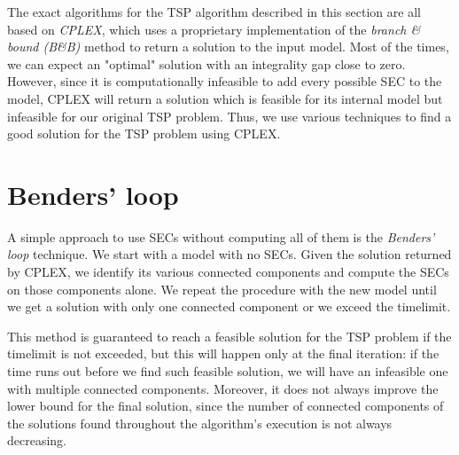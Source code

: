 The exact algorithms for the TSP algorithm described in this section are all based on \textit{CPLEX}, which uses a proprietary implementation of the \textit{branch \& bound (B\&B)} method to return a solution to the input model. Most of the times, we can expect an "optimal" solution with an integrality gap close to zero. However, since it is computationally infeasible to add every possible SEC to the model, CPLEX will return a solution which is feasible for its internal model but infeasible for our original TSP problem. Thus, we use various techniques to find a good solution for the TSP problem using CPLEX.

\section{Benders' loop}
A simple approach to use SECs without computing all of them is the \textit{Benders' loop} technique. We start with a model with no SECs. Given the solution returned by CPLEX, we identify its various connected components and compute the SECs on those components alone. We repeat the procedure with the new model until we get a solution with only one connected component or we exceed the timelimit.

This method is guaranteed to reach a feasible solution for the TSP problem if the timelimit is not exceeded, but this will happen only at the final iteration: if the time runs out before we find such feasible solution, we will have an infeasible one with multiple connected components. Moreover, it does not always improve the lower bound for the final solution, since the number of connected components of the solutions found throughout the algorithm's execution is not always decreasing.
\newpage
\FloatBarrier
